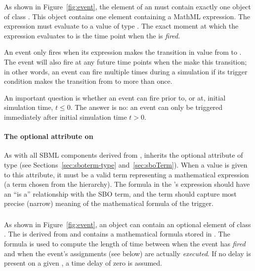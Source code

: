 As shown in Figure~\ref{fig:event}, the  element of
an \Event must contain exactly one object of class \Trigger.  This
object contains one  element containing a MathML
expression.  The expression must evaluate to a value of type
.  The exact moment at which the expression
evaluates to  is the time point when the \Event is
\emph{fired}.

An event only fires when its \Trigger expression makes the
transition in value from  to .  The event
will also fire at any future time points when the 
make this transition; in other words, an event can fire multiple
times during a simulation if its trigger condition makes the
transition from  to  more than once.

An important question is whether an event can fire prior to, or
at, initial simulation time, \ie $t \leq 0$.  The answer is no: an
event can only be triggered immediately after initial simulation
time \ie $t > 0$.


\paragraph{The optional  attribute on }
\label{sec:trigger-sboterm}

As with all SBML components derived from \SBase, \Trigger inherits
the optional attribute  of type
 (see Sections~\ref{sec:sboterm-type}
and~\ref{sec:sboTerm}).  When a value is given to this
attribute, it must be a valid term representing a
mathematical expression (\ie a term chosen from the
\sbomathformula hierarchy).  The formula in the \Trigger's
 expression should have an ``is a'' relationship with
the SBO term, and the term should capture most precise (narrow)
meaning of the mathematical formula of the trigger.


\subsubsection{}
\label{sec:event-delay}

As shown in Figure~\ref{fig:event}, an \Event object can contain
an optional  element of class \Delay.  The \Delay is
derived from \SBase and contains a mathematical formula stored in
.  The formula is used to compute the length of time
between when the event has \emph{fired} and when the event's
assignments (see below) are actually \emph{executed}.  If no delay
is present on a given \Event, a time delay of zero is assumed.

